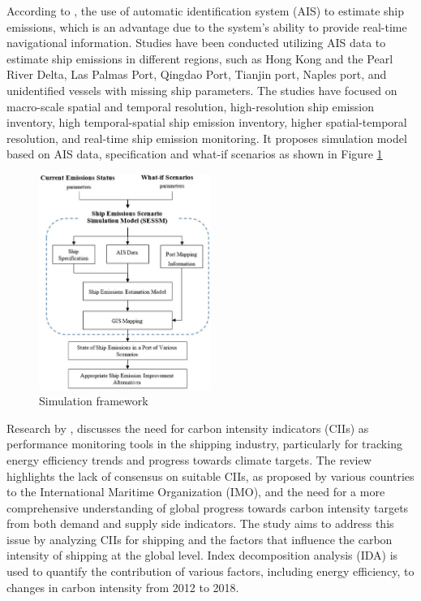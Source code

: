 According to \citeauthor{jmse10020129} \autocite{jmse10020129}, the use of automatic identification system (AIS) to estimate ship emissions, which is an advantage due to the system's ability to provide real-time navigational information.
Studies have been conducted utilizing AIS data to estimate ship emissions in different regions, such as Hong Kong and the Pearl River Delta, Las Palmas Port, Qingdao Port, Tianjin port, Naples port, and unidentified vessels with missing ship parameters.
The studies have focused on macro-scale spatial and temporal resolution, high-resolution ship emission inventory, high temporal-spatial ship emission inventory, higher spatial-temporal resolution, and real-time ship emission monitoring.
It proposes simulation model based on AIS data, specification and what-if scenarios as shown in Figure \ref{simaulationFramework}

\begin{figure}[h]
    \centering
    \includegraphics[width=0.5\textwidth]{images/simulation_framework.jpeg}
    \caption{Simulation framework}
    \label{simaulationFramework}
\end{figure}


Research by \citeauthor{SOU2022113239} \autocite{SOU2022113239}, discusses the need for carbon intensity indicators (CIIs) as performance monitoring tools in the shipping industry, particularly for tracking energy efficiency trends and progress towards climate targets.
The review highlights the lack of consensus on suitable CIIs, as proposed by various countries to the International Maritime Organization (IMO), and the need for a more comprehensive understanding of global progress towards carbon intensity targets from both demand and supply side indicators.
The study aims to address this issue by analyzing CIIs for shipping and the factors that influence the carbon intensity of shipping at the global level. Index decomposition analysis (IDA) is used to quantify the contribution of various factors, including energy efficiency, to changes in carbon intensity from 2012 to 2018.




